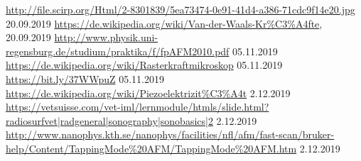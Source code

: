 \begin{thebibliography}{xxx}
        \url{http://file.scirp.org/Html/2-8301839/5ea73474-0e91-41d4-a386-71cdc9f14e20.jpg}
        20.09.2019
        \url{https://de.wikipedia.org/wiki/Van-der-Waals-Kr%C3%A4fte},
		20.09.2019
        \url{http://www.physik.uni-regensburg.de/studium/praktika/f/fpAFM2010.pdf}
        05.11.2019
        \url{https://de.wikipedia.org/wiki/Rasterkraftmikroskop}
        05.11.2019
        \url{https://bit.ly/37WWpuZ}
        05.11.2019
        \url{https://de.wikipedia.org/wiki/Piezoelektrizit%C3%A4t}
	2.12.2019
	\url{https://vetsuisse.com/vet-iml/lernmodule/htmls/slide.html?radiosurfvet|radgeneral|sonography|sonobasics|2}
	2.12.2019
	\url{http://www.nanophys.kth.se/nanophys/facilities/nfl/afm/fast-scan/bruker-help/Content/TappingMode%20AFM/TappingMode%20AFM.htm}
	2.12.2019
\end{thebibliography}
 
